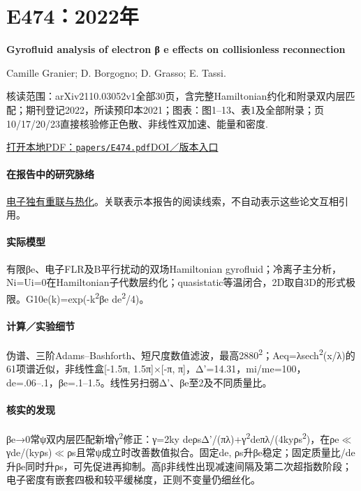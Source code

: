 \section{E474：2022年}\label{paper:E474}

\textbf{Gyrofluid analysis of electron β e effects on collisionless reconnection}\citep{E474}\

Camille Granier;  D. Borgogno;  D. Grasso;  E. Tassi.

\textsf{核读范围：}arXiv2110.03052v1全部30页，含完整Hamiltonian约化和附录双内层匹配；期刊登记2022，所读预印本2021；\textsf{图表：}图1–13、表1及全部附录；页10/17/20/23直接核验修正色散、非线性双加速、能量和密度.

\href{run:papers/E474.pdf}{打开本地PDF：\texttt{papers/E474.pdf}}\quad\href{https://doi.org/10.1017/s0022377822000010}{DOI／版本入口}

\paragraph{在报告中的研究脉络}\hyperref[story:energy]{电子独有重联与热化}。关联表示本报告的阅读线索，不自动表示这些论文互相引用。

\paragraph{实际模型}有限βe、电子FLR及B平行扰动的双场Hamiltonian gyrofluid；冷离子主分析，Ni=Ui=0在Hamiltonian子代数层约化；quasistatic等温闭合，2D取自3D的形式极限。G10e(k)=exp(-k\textsuperscript{2}βe de\textsuperscript{2}/4)。

\paragraph{计算／实验细节}伪谱、三阶Adams–Bashforth、短尺度数值滤波，最高2880\textsuperscript{2}；Aeq=λsech\textsuperscript{2}(x/λ)的61项谱近似，非线性盒[-1.5π, 1.5π]×[-π, π]，Δ'=14.31，mi/me=100，de=.06–.1，βe=.1–1.5。线性另扫弱Δ'、βe至2及不同质量比。

\paragraph{核实的发现}βe→0常ψ双内层匹配新增γ\textsuperscript{2}修正：γ=2ky deρsΔ'/(πλ)+γ\textsuperscript{2}deπλ/(4kyρs\textsuperscript{2})，在ρe\ensuremath{\ll}γde/(kyρs)\ensuremath{\ll}ρs且常ψ成立时改善数值拟合。固定de, ρs升βe稳定；固定质量比/de升βe同时升ρs，可先促进再抑制。高β非线性出现减速间隔及第二次超指数阶段；电子密度有嵌套四极和较平缓梯度，正则不变量仍细丝化。

